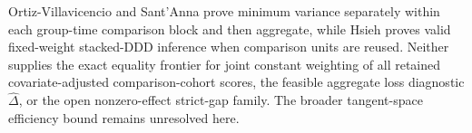 Ortiz-Villavicencio and Sant'Anna prove minimum variance separately within each group-time comparison block and then aggregate, while Hsieh proves valid fixed-weight stacked-DDD inference when comparison units are reused. Neither supplies the exact equality frontier for joint constant weighting of all retained covariate-adjusted comparison-cohort scores, the feasible aggregate loss diagnostic \(\widehat\Delta\), or the open nonzero-effect strict-gap family. The broader tangent-space efficiency bound remains unresolved here.